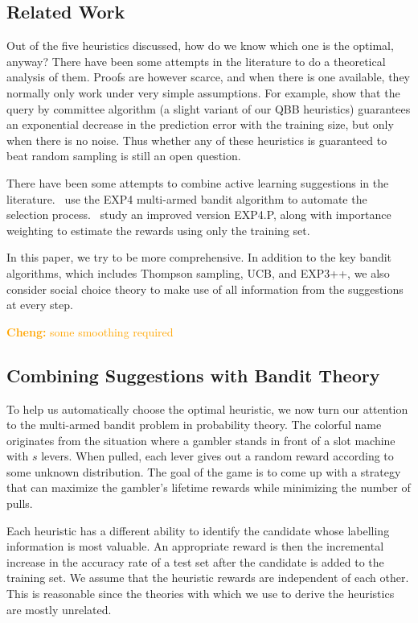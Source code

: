 \documentclass[fleqn,10pt,lineno]{wlpeerj} %
\newcommand{\cheng}[1]{\textcolor{orange}{\textbf{Cheng: }{\footnotesize #1}}}
\begin{document}
\subsection*{Related Work}

Out of the five heuristics discussed, how do we know which one is the optimal,
anyway? There have been some attempts in the literature to do a theoretical
analysis of them. Proofs are however scarce, and when there is one available,
they normally only work under very simple assumptions. For example,
\cite{freund97} show that the query by committee algorithm (a slight variant of
our QBB heuristics) guarantees an exponential decrease in the prediction error
with the training size, but only when there is no noise. Thus whether any of
these heuristics is guaranteed to beat random sampling is still an open
question.

There have been some attempts to combine active learning suggestions in the
literature.~\cite{baram04} use the EXP4 multi-armed bandit algorithm to
automate the selection process.~\cite{hsu15} study an improved version
EXP4.P, along with importance weighting to estimate the rewards using only the
training set.

In this paper, we try to be more comprehensive. In addition to the key bandit
algorithms, which includes Thompson sampling, UCB, and EXP3++, we also consider
social choice theory to make use of all information from the suggestions at
every step.

\cheng{some smoothing required}

\subsection*{Combining Suggestions with Bandit Theory}

To help us automatically choose the optimal heuristic, we now turn our
attention to the multi-armed bandit problem in probability theory. The
colorful name originates from the situation where a gambler stands in front of
a slot machine with $s$ levers. When pulled, each lever gives out a random
reward according to some unknown distribution. The goal of the game is to come
up with a strategy that can maximize the gambler's lifetime rewards while
minimizing the number of pulls.

Each heuristic has a different ability to identify the candidate whose
labelling information is most valuable. An appropriate reward is then the
incremental increase in the accuracy rate of a test set after the candidate is
added to the training set. We assume that the heuristic rewards are independent
of each other. This is reasonable since the theories with which we use to
derive the heuristics are mostly unrelated.
\end{document}
